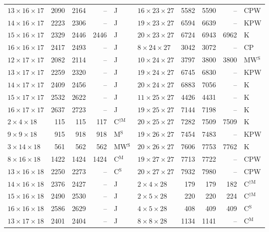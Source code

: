 \begin{longtable}{@{}lrrrl@{\hspace{6mm}}lrrrl@{}}
$13{\times}16{\times}17$ & 2090 & 2164 & -- & J & $16{\times}23{\times}27$ & 5582 & 5590 & -- & CPW\\
$14{\times}16{\times}17$ & 2223 & 2306 & -- & J & $19{\times}23{\times}27$ & 6594 & 6639 & -- & KPW\\
$15{\times}16{\times}17$ & 2329 & 2446 & 2446 & J & $20{\times}23{\times}27$ & 6724 & 6943 & 6962 & K\\
$16{\times}16{\times}17$ & 2417 & 2493 & -- & J & $8{\times}24{\times}27$ & 3042 & 3072 & -- & CP\\
$12{\times}17{\times}17$ & 2082 & 2114 & -- & J & $10{\times}24{\times}27$ & 3797 & 3800 & 3800 & MW$^{\mathrm{S}}$\\
$13{\times}17{\times}17$ & 2259 & 2320 & -- & J & $19{\times}24{\times}27$ & 6745 & 6830 & -- & KPW\\
$14{\times}17{\times}17$ & 2409 & 2456 & -- & J & $20{\times}24{\times}27$ & 6883 & 7056 & -- & K\\
$15{\times}17{\times}17$ & 2532 & 2622 & -- & J & $11{\times}25{\times}27$ & 4426 & 4431 & -- & K\\
$16{\times}17{\times}17$ & 2637 & 2723 & -- & J & $19{\times}25{\times}27$ & 7144 & 7198 & -- & K\\
$2{\times}4{\times}18$ & 115 & 115 & 117 & C$^{\dagger\mathrm{M}}$ & $20{\times}25{\times}27$ & 7282 & 7509 & 7509 & K\\
$9{\times}9{\times}18$ & 915 & 918 & 918 & M$^{\mathrm{S}}$ & $19{\times}26{\times}27$ & 7454 & 7483 & -- & KPW\\
$3{\times}14{\times}18$ & 561 & 562 & 562 & MW$^{\mathrm{S}}$ & $20{\times}26{\times}27$ & 7606 & 7753 & 7762 & K\\
$8{\times}16{\times}18$ & 1422 & 1424 & 1424 & C$^{\mathrm{M}}$ & $19{\times}27{\times}27$ & 7713 & 7722 & -- & CPW\\
$13{\times}16{\times}18$ & 2250 & 2273 & -- & C$^{\mathrm{S}}$ & $20{\times}27{\times}27$ & 7932 & 7980 & -- & CPW\\
$14{\times}16{\times}18$ & 2376 & 2427 & -- & J & $2{\times}4{\times}28$ & 179 & 179 & 182 & C$^{\dagger\mathrm{M}}$\\
$15{\times}16{\times}18$ & 2490 & 2530 & -- & J & $2{\times}5{\times}28$ & 220 & 220 & 224 & C$^{\dagger\mathrm{M}}$\\
$16{\times}16{\times}18$ & 2586 & 2629 & -- & J & $4{\times}5{\times}28$ & 408 & 409 & 409 & C$^{\mathrm{S}}$\\
$13{\times}17{\times}18$ & 2401 & 2404 & -- & J & $8{\times}8{\times}28$ & 1134 & 1141 & -- & C$^{\mathrm{M}}$\\

\end{longtable}

